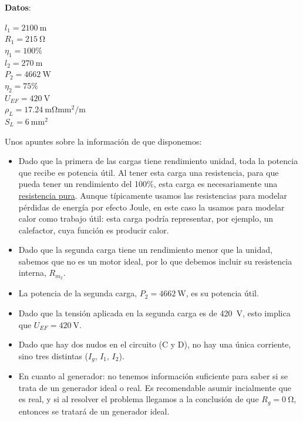 \begin{example}
\begin{minipage}{0.275\linewidth}
      \vspace{-5mm}
      \textbf{Datos}:
      
      \vspace{2mm}
    
      $l_1 = \qty{2100}{\meter}$\\
      $R_1 = \qty{215}{\ohm}$\\
      $\eta_1 = 100\%$\\
      $l_2 = \qty{270}{\meter}$\\
      $P_2 = \qty{4662}{\watt}$\\
      $\eta_2 = 75\%$\\
      $U_{EF} = \qty{420}{\volt}$\\
      $\rho_L = \qty{17.24}{\milli\ohm\milli\meter\squared\per\meter}$\\
      $S_L = \qty{6}{\milli\meter\squared}$
    \end{minipage}
    
    \vspace{6mm}
    
    Unos apuntes sobre la información de que disponemos:
    \begin{itemize}
        \item Dado que la primera de las cargas tiene rendimiento unidad, toda la potencia que recibe es potencia útil. Al tener esta carga una resistencia, para que pueda tener un rendimiento del 100\%, esta carga es necesariamente una \underline{resistencia pura}. Aunque típicamente usamos las resistencias para modelar pérdidas de energía por efecto Joule, en este caso la usamos para modelar calor como trabajo útil: esta carga podría representar, por ejemplo, un calefactor, cuya función es producir calor.
        \item Dado que la segunda carga tiene un rendimiento menor que la unidad, sabemos que no es un motor ideal, por lo que debemos incluir su resistencia interna, $R_{m_2}$.
        \item La potencia de la segunda carga, $P_2 = \qty{4662}{\watt}$, es su potencia útil.
        \item Dado que la tensión aplicada en la segunda carga es de \qty{420}{\volt}, esto implica que $U_{EF} = \qty{420}{\volt}$.
        \item Dado que hay dos nudos en el circuito (C y D), no hay una única corriente, sino tres distintas ($I_g, \, I_1, \, I_2$).
        \item En cuanto al generador: no tenemos información suficiente para saber si se trata de un generador ideal o real. Es recomendable asumir incialmente que es real, y si al resolver el problema llegamos a la conclusión de que $R_g=\qty{0}{\ohm}$, entonces se tratará de un generador ideal.
    \end{itemize}
    

\end{example}
